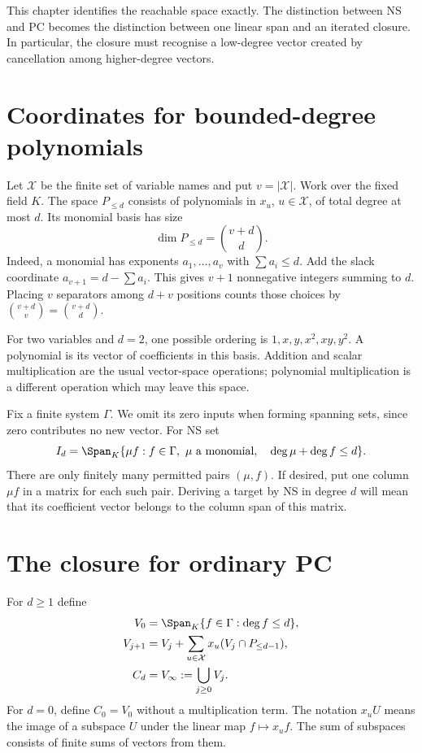 \documentclass[11pt,a4paper,oneside,openany]{book}
\theoremstyle{definition}\newtheorem{definition}[theorem]{Definition}
\theoremstyle{remark}\newtheorem{remark}[theorem]{Remark}
\numberwithin{equation}{chapter}
\begin{document}
This chapter identifies the reachable space exactly. The distinction
between NS and PC becomes the distinction between one linear span and
an iterated closure. In particular, the closure must recognise a
low-degree vector created by cancellation among higher-degree vectors.

\section{Coordinates for bounded-degree polynomials}
Let $\mathcal X$ be the finite set of variable names and put
$v=|\mathcal X|$. Work over the fixed field $K$. The space $P_{\le d}$
consists of polynomials in $x_u$, $u\in\mathcal X$, of total degree at
most $d$. Its monomial basis has size
\[
                     \dim P_{\le d}=\binom{v+d}{d}.
\]
Indeed, a monomial has exponents $a_1,\ldots,a_v$ with
$\sum a_i\le d$. Add the slack coordinate
$a_{v+1}=d-\sum a_i$. This gives $v+1$ nonnegative integers summing
to $d$. Placing $v$ separators among $d+v$ positions counts those
choices by $\binom{v+d}{v}=\binom{v+d}{d}$.

For two variables and $d=2$, one possible ordering is
$1,x,y,x^2,xy,y^2$. A polynomial is its vector of coefficients in this
basis. Addition and scalar multiplication are the usual vector-space
operations; polynomial multiplication is a different operation which
may leave this space.

Fix a finite system $\Gamma$. We omit its zero inputs when forming
spanning sets, since zero contributes no new vector. For NS set
\begin{equation}\label{tx:eq:NSspan}
 I_d=\Span_K\{\mu f:f\in\Gamma,\ \mu\text{ a monomial},\quad
                              \deg\mu+\deg f\le d\}.
\end{equation}
There are only finitely many permitted pairs $(\mu,f)$. If desired,
put one column $\mu f$ in a matrix for each such pair. Deriving a target
by NS in degree $d$ will mean that its coefficient vector belongs to
the column span of this matrix.

\section{The closure for ordinary PC}
For $d\ge1$ define
\begin{equation}\label{tx:eq:closure}
 \begin{split}
 V_0&=\Span_K\{f\in\Gamma:\deg f\le d\},\\
 V_{j+1}&=V_j+\sum_{u\in\mathcal X}x_u(V_j\cap P_{\le d-1}),\\
 C_d&=V_\infty:=\bigcup_{j\ge0}V_j.
 \end{split}
\end{equation}
For $d=0$, define $C_0=V_0$ without a multiplication term.
The notation $x_uU$ means the image of a subspace $U$ under the linear
map $f\mapsto x_uf$. The sum of subspaces consists of finite sums of
vectors from them.
\end{document}
